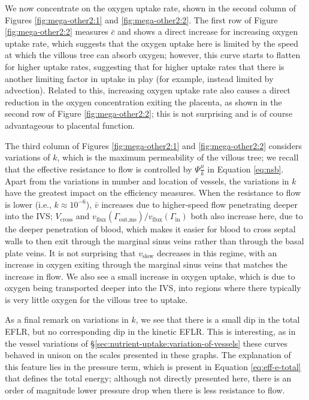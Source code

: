             We now concentrate on the oxygen uptake rate, shown in the second column of Figures \ref{fig:mega-other2:1} and \ref{fig:mega-other2:2}. The first row of Figure \ref{fig:mega-other2:2} measures $\bar{c}$ and shows a direct increase for increasing oxygen uptake rate, which suggests that the oxygen uptake here is limited by the speed at which the villous tree can absorb oxygen; however, this curve starts to flatten for higher uptake rates, suggesting that for higher uptake rates that there is another limiting factor in uptake in play (for example, instead limited by advection). Related to this, increasing oxygen uptake rate also causes a direct reduction in the oxygen concentration exiting the placenta, as shown in the second row of Figure \ref{fig:mega-other2:2}; this is not surprising and is of course advantageous to placental function.

            The third column of Figures \ref{fig:mega-other2:1} and \ref{fig:mega-other2:2} considers variations of $k$, which is the maximum permeability of the villous tree; we recall that the effective resistance to flow is controlled by $\Psi \frac{\mu}{k}$ in Equation \eqref{eq:nsb}. Apart from the variations in number and location of vessels, the variations in $k$ have the greatest impact on the efficiency measures. When the resistance to flow is lower (i.e., $k \approx 10^{-6}$), $\bar{v}$ increases due to higher-speed flow penetrating deeper into the IVS; $V_\text{cross}$ and $v_\text{flux}(\Gamma_\text{out,ms})/v_\text{flux}(\Gamma_\text{in})$ both also increase here, due to the deeper penetration of blood, which makes it easier for blood to cross septal walls to then exit through the marginal sinus veins rather than through the basal plate veins. It is not surprising that $v_\text{slow}$ decreases in this regime, with an increase in oxygen exiting through the marginal sinus veins that matches the increase in flow. We also see a small increase in oxygen uptake, which is due to oxygen being transported deeper into the IVS, into regions where there typically is very little oxygen for the villous tree to uptake.

            As a final remark on variations in $k$, we see that there is a small dip in the total EFLR, but no corresponding dip in the kinetic EFLR. This is interesting, as in the vessel variations of \S\ref{sec:nutrient-uptake:variation-of-vessels} these curves behaved in unison on the scales presented in these graphs. The explanation of this feature lies in the pressure term, which is present in Equation \eqref{eq:eff-e-total} that defines the total energy; although not directly presented here, there is an order of magnitude lower pressure drop when there is less resistance to flow.

